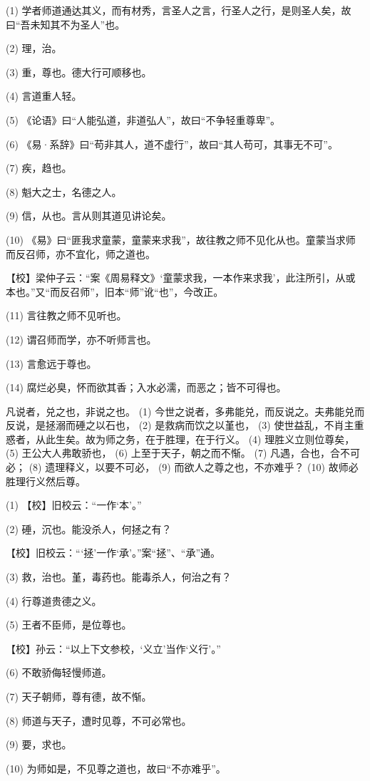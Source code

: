 \documentclass[12pt,UTF8]{ctexbook}
\begin{document}
(1) 学者师道通达其义，而有材秀，言圣人之言，行圣人之行，是则圣人矣，故曰“吾未知其不为圣人”也。

(2) 理，治。

(3) 重，尊也。德大行可顺移也。

(4) 言道重人轻。

(5) 《论语》曰“人能弘道，非道弘人”，故曰“不争轻重尊卑”。

(6) 《易·系辞》曰“苟非其人，道不虚行”，故曰“其人苟可，其事无不可”。

(7) 疾，趋也。

(8) 魁大之士，名德之人。

(9) 信，从也。言从则其道见讲论矣。

(10) 《易》曰“匪我求童蒙，童蒙来求我”，故往教之师不见化从也。童蒙当求师而反召师，亦不宜化，师之道也。

【校】梁仲子云：“案《周易释文》‘童蒙求我，一本作来求我’，此注所引，从或本也。”又“而反召师”，旧本“师”讹“也”，今改正。

(11) 言往教之师不见听也。

(12) 谓召师而学，亦不听师言也。

(13) 言愈远于尊也。

(14) 腐烂必臭，怀而欲其香；入水必濡，而恶之；皆不可得也。

凡说者，兑之也，非说之也。 (1) 今世之说者，多弗能兑，而反说之。夫弗能兑而反说，是拯溺而硾之以石也， (2) 是救病而饮之以堇也， (3) 使世益乱，不肖主重惑者，从此生矣。故为师之务，在于胜理，在于行义。 (4) 理胜义立则位尊矣， (5) 王公大人弗敢骄也， (6) 上至于天子，朝之而不惭。 (7) 凡遇，合也，合不可必； (8) 遗理释义，以要不可必， (9) 而欲人之尊之也，不亦难乎？ (10) 故师必胜理行义然后尊。

(1) 【校】旧校云：“一作‘本’。”

(2) 硾，沉也。能没杀人，何拯之有？

【校】旧校云：“‘拯’一作‘承’。”案“拯”、“承”通。

(3) 救，治也。堇，毒药也。能毒杀人，何治之有？

(4) 行尊道贵德之义。

(5) 王者不臣师，是位尊也。

【校】孙云：“以上下文参校，‘义立’当作‘义行’。”

(6) 不敢骄侮轻慢师道。

(7) 天子朝师，尊有德，故不惭。

(8) 师道与天子，遭时见尊，不可必常也。

(9) 要，求也。

(10) 为师如是，不见尊之道也，故曰“不亦难乎”。
\end{document}
